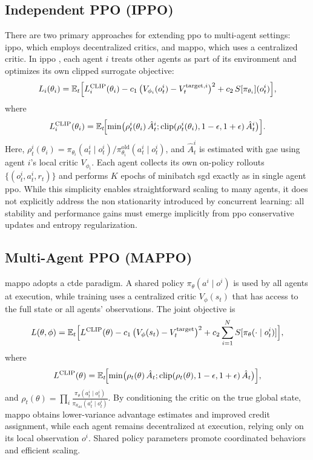 \subsection{Independent PPO (IPPO)}
There are two primary approaches for extending \gls{ppo} to multi-agent settings: \gls{ippo}, which employs decentralized critics, and \gls{mappo}, which uses a centralized critic.
In \gls{ippo} \cite{witt_is_2020}, each agent \(i\) treats other agents as part of its environment and optimizes its own clipped surrogate objective:
\begin{equation}
L_i(\theta_i) = \mathbb{E}_t\Bigl[L^{\mathrm{CLIP}}_i(\theta_i) 
  - c_1\,\bigl(V_{\phi_i}(o^i_t)-V^{\text{target},i}_t\bigr)^2 
  + c_2\,S[\pi_{\theta_i}](o^i_t)\Bigr],
\end{equation}
where
\begin{equation}
L^{\mathrm{CLIP}}_i(\theta_i) = \mathbb{E}_t\!\Bigl[\min\bigl(\rho^i_t(\theta_i)\,\hat{A}^i_t;\text{clip}(\rho^i_t(\theta_i),1-\epsilon,1+\epsilon)\,\hat{A}^i_t\bigr)\Bigr].
\end{equation}
Here, \(\rho^i_t(\theta_i)=\pi_{\theta_i}(a^i_t\mid o^i_t)/\pi_{\theta_i}^{\mathrm{old}}(a^i_t\mid o^i_t)\), and \(\hat{A}^i_t\) is estimated with \gls{gae} using agent \(i\)'s local critic \(V_{\phi_i}\). Each agent collects its own on-policy rollouts \(\{(o^i_t,a^i_t,r_t)\}\) and performs \(K\) epochs of minibatch \gls{sgd} exactly as in single agent \gls{ppo}.  While this simplicity enables straightforward scaling to many agents, it does not explicitly address the non stationarity introduced by concurrent learning: all stability and performance gains must emerge implicitly from \gls{ppo} conservative updates and entropy regularization. 

\subsection{Multi-Agent PPO (MAPPO)}
\gls{mappo} \cite{yu_surprising_2022} adopts a \gls{ctde} paradigm. A shared policy \(\pi_\theta(a^i\mid o^i)\) is used by all agents at execution, while training uses a centralized critic \(V_\phi(s_t)\) that has access to the full state or all agents' observations. The joint objective is
\begin{equation}
L(\theta,\phi) = \mathbb{E}_t\Bigl[L^{\mathrm{CLIP}}(\theta)
  - c_1\,\bigl(V_\phi(s_t)-V^{\text{target}}_t\bigr)^2
  + c_2 \sum_{i=1}^N S[\pi_\theta(\cdot\mid o^i_t)]\Bigr],
\end{equation}
where 
\begin{equation}
L^{\mathrm{CLIP}}(\theta) = \mathbb{E}_t\!\Bigl[\min\bigl(\rho_t(\theta)\,\hat{A}_t;\text{clip}(\rho_t(\theta),1-\epsilon,1+\epsilon)\,\hat{A}_t\bigr)\Bigr],
\end{equation}
and \(\rho_t(\theta)=\prod_i \frac{\pi_\theta(a^i_t\mid o^i_t)}{\pi_{\theta_{\text{old}}}(a^i_t\mid o^i_t)}\). By conditioning the critic on the true global state, \gls{mappo} obtains lower-variance advantage estimates and improved credit assignment, while each agent remains decentralized at execution, relying only on its local observation \(o^i\). Shared policy parameters promote coordinated behaviors and efficient scaling.

